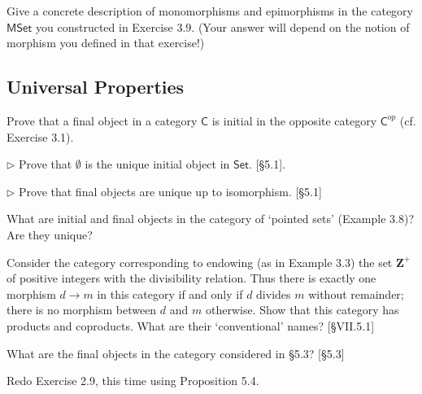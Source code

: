 \begin{problem}
  \def \MSet {\mathsf{MSet}}
  Give a concrete description of monomorphisms and epimorphisms in the
  category $\MSet$ you constructed in Exercise 3.9. (Your answer will depend
  on the notion of morphism you defined in that exercise!)
\end{problem}

\subsection{Universal Properties}

\begin{problem}
  \def \C {\mathsf{C}}
  \def \Cop {{\mathsf{C}^{op}}}
  Prove that a final object in a category $\C$ is initial in the opposite
  category $\Cop$ (cf. Exercise 3.1).
\end{problem}

\begin{problem}
  \def \Set {\mathsf{Set}}
  $\rhd$ Prove that $\emptyset$ is the unique initial object in $\Set$.
  [\S 5.1].
\end{problem}

\begin{problem}
  $\rhd$ Prove that final objects are unique up to isomorphism. [\S 5.1]
\end{problem}

\begin{problem}
  What are initial and final objects in the category of `pointed sets'
  (Example 3.8)? Are they unique?
\end{problem}

\begin{problem}
  Consider the category corresponding to endowing (as in Example 3.3) the set
  $\mathbf{Z}^+$ of positive integers with the divisibility relation. Thus
  there is exactly one morphism $d\to m$ in this category if and only if $d$
  divides $m$ without remainder; there is no morphism between $d$ and $m$
  otherwise. Show that this category has products and coproducts. What are
  their `conventional' names? [\S VII.5.1]
\end{problem}

\begin{problem}
  What are the final objects in the category considered in \S5.3? [\S5.3]
\end{problem}

\begin{problem}
  Redo Exercise 2.9, this time using Proposition 5.4.
\end{problem}

